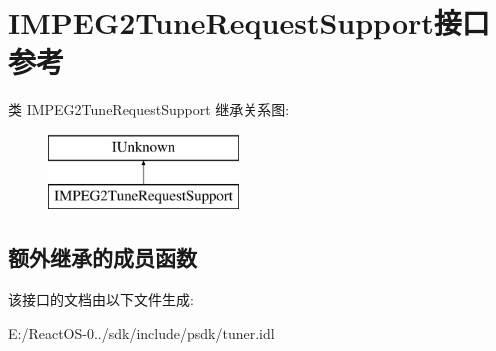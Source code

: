 \hypertarget{interface_i_m_p_e_g2_tune_request_support}{}\section{I\+M\+P\+E\+G2\+Tune\+Request\+Support接口 参考}
\label{interface_i_m_p_e_g2_tune_request_support}
类 I\+M\+P\+E\+G2\+Tune\+Request\+Support 继承关系图\+:\begin{figure}[H]
\begin{center}
\leavevmode
\includegraphics[height=2.000000cm]{interface_i_m_p_e_g2_tune_request_support}
\end{center}
\end{figure}
\subsection*{额外继承的成员函数}


该接口的文档由以下文件生成\+:\begin{DoxyCompactItemize}
\item 
E\+:/\+React\+O\+S-\/0../sdk/include/psdk/tuner.\+idl\end{DoxyCompactItemize}

